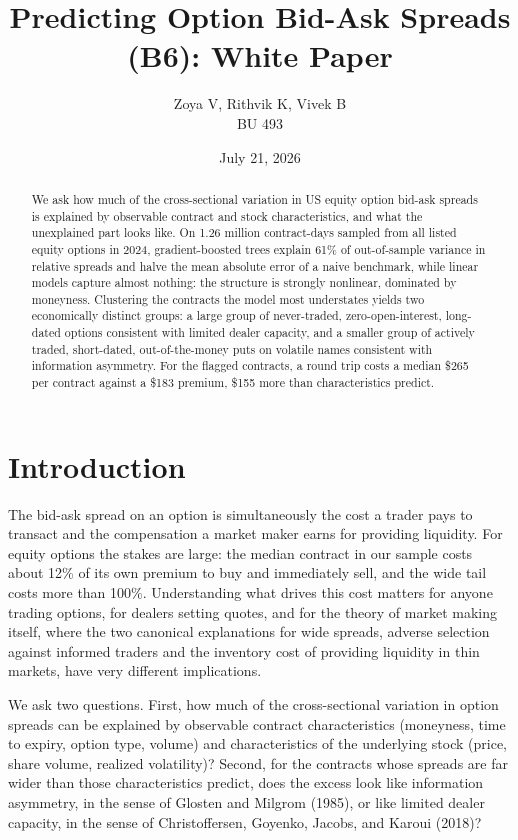 \documentclass[11pt]{article}
\title{\textbf{Predicting Option Bid-Ask Spreads (B6): White Paper}}
\author{Zoya V, Rithvik K, Vivek B \\ BU 493}
\date{July 21, 2026}
\begin{document}
\maketitle

\begin{abstract}
\noindent We ask how much of the cross-sectional variation in US equity option
bid-ask spreads is explained by observable contract and stock characteristics,
and what the unexplained part looks like. On 1.26 million contract-days sampled
from all listed equity options in 2024, gradient-boosted trees explain 61\% of
out-of-sample variance in relative spreads and halve the mean absolute error of
a naive benchmark, while linear models capture almost nothing: the structure is
strongly nonlinear, dominated by moneyness. Clustering the contracts the model
most understates yields two economically distinct groups: a large group of
never-traded, zero-open-interest, long-dated options consistent with limited
dealer capacity, and a smaller group of actively traded, short-dated,
out-of-the-money puts on volatile names consistent with information asymmetry.
For the flagged contracts, a round trip costs a median \$265 per contract
against a \$183 premium, \$155 more than characteristics predict.
\end{abstract}

\section{Introduction}

The bid-ask spread on an option is simultaneously the cost a trader pays to
transact and the compensation a market maker earns for providing liquidity.
For equity options the stakes are large: the median contract in our sample
costs about 12\% of its own premium to buy and immediately sell, and the wide
tail costs more than 100\%. Understanding what drives this cost matters for
anyone trading options, for dealers setting quotes, and for the theory of
market making itself, where the two canonical explanations for wide spreads,
adverse selection against informed traders and the inventory cost of providing
liquidity in thin markets, have very different implications.

We ask two questions. First, how much of the cross-sectional variation in
option spreads can be explained by observable contract characteristics
(moneyness, time to expiry, option type, volume) and characteristics of the
underlying stock (price, share volume, realized volatility)? Second, for the
contracts whose spreads are far wider than those characteristics predict, does
the excess look like information asymmetry, in the sense of Glosten and
Milgrom (1985), or like limited dealer capacity, in the sense of
Christoffersen, Goyenko, Jacobs, and Karoui (2018)?
\end{document}
